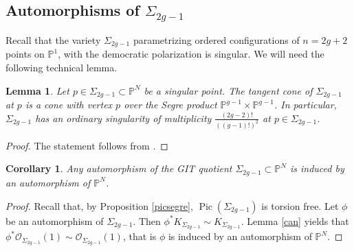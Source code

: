 \documentclass[a4paper,10pt]{amsart}
\newtheorem{Lemma}[thm]{Lemma}
\newtheorem{Corollary}[thm]{Corollary}
\theoremstyle{definition}
\renewcommand{\P}{\mathbb{P}}
\DeclareMathOperator{\Pic}{Pic}
\begin{document}
\subsection{Automorphisms of $\Sigma_{2g-1}$}
Recall that the variety $\Sigma_{2g-1}$ parametrizing ordered configurations of $n=2g+2$ points on $\P^1$, with the democratic polarization is singular. We will need the following technical lemma.

\begin{Lemma}\label{tangcone}
Let $p\in \Sigma_{2g-1}\subset\mathbb{P}^N$ be a singular point. The tangent cone of $\Sigma_{2g-1}$ at $p$ is a cone with vertex $p$ over the Segre product $\mathbb{P}^{g-1}\times \mathbb{P}^{g-1}$. In particular, $\Sigma_{2g-1}$ has an ordinary singularity of multiplicity $\frac{(2g-2)!}{((g-1)!)^2}$ at $p\in \Sigma_{2g-1}$.
\end{Lemma} 
\begin{proof}
The statement follows from \cite[Lemma 4.3]{HMSV09}.
\end{proof}

\begin{Corollary}\label{linaut}
Any automorphism of the GIT quotient $\Sigma_{2g-1}\subset\mathbb{P}^N$ is induced by an automorphism of $\mathbb{P}^N$.
\end{Corollary} 
\begin{proof}
Recall that, by Proposition \ref{picsegre}, $\Pic(\Sigma_{2g-1})$ is torsion free. Let $\phi$ be an automorphism of $\Sigma_{2g-1}$. Then $\phi^{*}K_{\Sigma_{2g-1}}\sim K_{\Sigma_{2g-1}}$. Lemma \ref{can} yields that $\phi^{*}\mathcal{O}_{\Sigma_{2g-1}}(1)\sim \mathcal{O}_{\Sigma_{2g-1}}(1)$, that is $\phi$ is induced by an automorphism of $\mathbb{P}^N$.
\end{proof}
 
\end{document}
